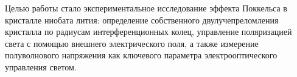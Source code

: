 Целью работы стало экспериментальное исследование эффекта Поккельса в кристалле ниобата лития: определение собственного двулучепреломления кристалла по радиусам интерференционных колец, управление поляризацией света с помощью внешнего электрического поля, а также измерение полуволнового напряжения как ключевого параметра электрооптического управления светом.
